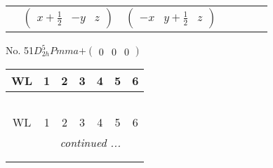 \documentclass[fleqn,9pt,landscape]{jsarticle}
\begin{document}
\begin{center}
\begin{longtable}{ccccccc}
& $ \begin{pmatrix} x + \frac{1}{2} & - y & z \end{pmatrix} $ & $ \begin{pmatrix} - x & y + \frac{1}{2} & z \end{pmatrix} $ & $  $ & $  $ & $  $ & $  $ \\
\end{longtable}
\end{center}
\newpage
No. 51\quad$D_{2h}^{5}$\quad$Pmma$\quad[ orthorhombic ]\quad$+\begin{pmatrix} 0 & 0 & 0 \end{pmatrix}$
\begin{center}
\renewcommand{\arraystretch}{1.2}
\begin{longtable}{ccccccc}
 \hline \hline
WL & 1 & 2 & 3 & 4 & 5 & 6 \\ \hline \endfirsthead

\multicolumn{6}{l}{\tablename\ \thetable{}} \\
 \hline \hline
WL & 1 & 2 & 3 & 4 & 5 & 6 \\ \hline \endhead

 \hline \hline
\multicolumn{6}{r}{\footnotesize\it continued ...} \\ \endfoot

 \hline \hline
\multicolumn{6}{r}{} \\ \endlastfoot


\end{longtable}
\end{center}
\end{document}
